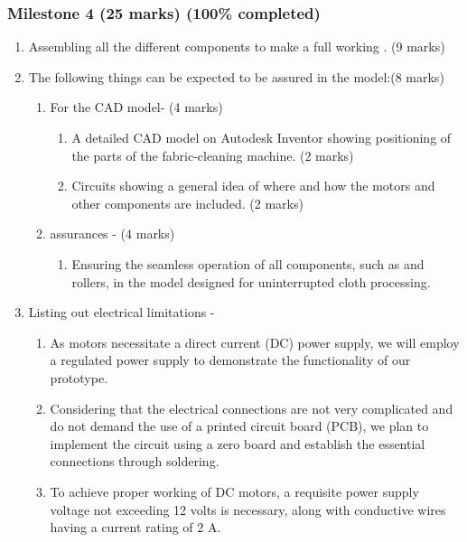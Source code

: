 \documentclass[table,french,english]{rapportCS}
\begin{document}
\subsubsection{Milestone 4 (25 marks) (100\% completed)}
\begin{enumerate}[label=\arabic*.]
    \item  Assembling all the different components to make a full working   . (9 marks)
    \item  The following things can be expected to be assured in the model:(8 marks)
    \begin{enumerate}[label=\alph*.]
        \item For the CAD model- (4 marks)
        \begin{enumerate}[label=\roman*.]
            \item A detailed CAD model on Autodesk Inventor showing positioning of the parts of the fabric-cleaning machine. (2 marks)
            \item Circuits showing a general idea of where and how the motors and other components are included. (2 marks)
            \end{enumerate}
        \item {} assurances - (4 marks)
        \begin{enumerate}[label=\roman*.]
           \item Ensuring the seamless operation of all components, such as   and rollers, in the   model designed for uninterrupted cloth processing.
           \end{enumerate}
        \end{enumerate}
\newpage
\item Listing out electrical limitations -
    \begin{enumerate}[label=\alph*.]
        \item As motors necessitate a direct current  (DC) power supply, we will employ a regulated power supply to demonstrate the functionality of our prototype.
        \item Considering that the electrical connections are not very complicated and do not demand the use of a printed circuit board (PCB), we plan to implement the circuit using a zero board and establish the essential connections through soldering.
        \item To achieve proper working of DC motors, a requisite power supply voltage not exceeding 12 volts is necessary, along with conductive wires having a current rating of 2 A.
        \end{enumerate}
        

\end{enumerate}
\end{document}
